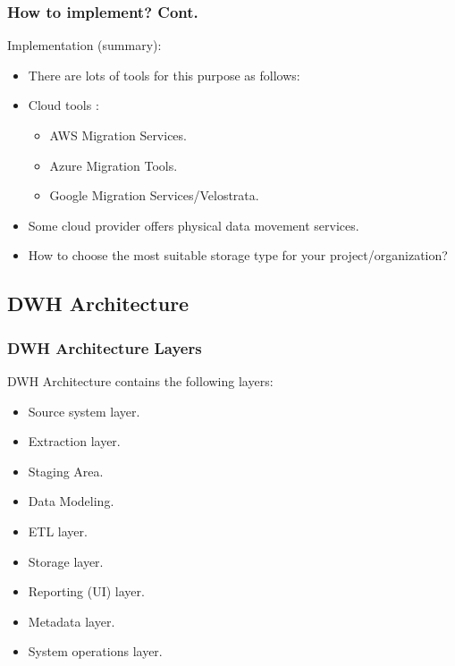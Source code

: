 
\begin{frame}
    \frametitle{How to implement? Cont.}
    \begin{wideitemize}
        \item Implementation (summary):
        \begin{itemize}[<+->]
            \item There are lots of tools for this purpose as follows:
            \item Cloud tools \faEdit \space \faArrowCircleORight \space:
            \begin{itemize}
                \item AWS Migration Services.
                \item Azure Migration Tools.
                \item Google Migration Services/Velostrata.
            \end{itemize}
            \item Some cloud provider offers physical data movement services.
            \item How to choose the most suitable storage type for your project/organization?
        \end{itemize}
    \end{wideitemize}
\end{frame}


\subsection{DWH Architecture}
\begin{frame}
    \frametitle{DWH Architecture Layers}

    \begin{wideitemize}
        \item DWH Architecture contains the following layers:
        \begin{itemize}[<+->]
            \item Source system layer.
            \item Extraction layer.
            \item Staging Area.
            \item Data Modeling.
            \item ETL layer.
            \item Storage layer.
            \item Reporting (UI) layer.
            \item Metadata layer.
            \item System operations layer.
        \end{itemize}
    \end{wideitemize}

\end{frame}

